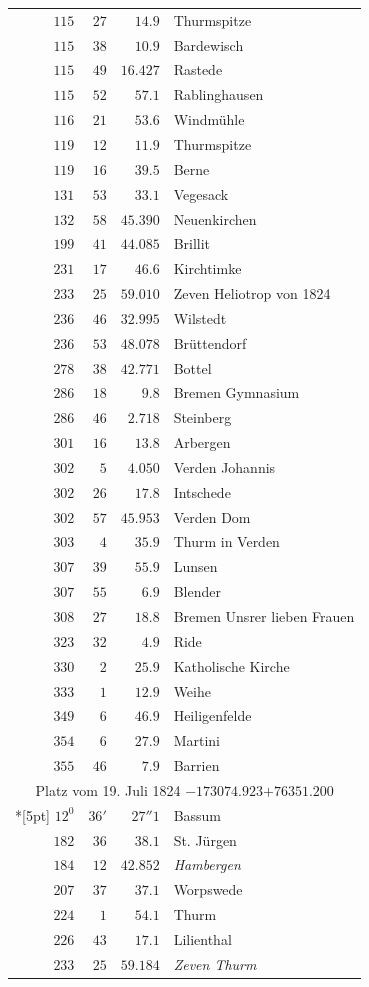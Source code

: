 \begin{longtable}{@{}rrrp{.61\linewidth}@{}}
\(115\)&\(27\)&\(14.9\)&\raggedright Thurmspitze\tabularnewline
\(115\)&\(38\)&\(10.9\)&\raggedright Bardewisch\tabularnewline
\(115\)&\(49\)&\(16.427\)&\raggedright Rastede\tabularnewline
\(115\)&\(52\)&\(57.1\)&\raggedright Rablinghausen\tabularnewline
\(116\)&\(21\)&\(53.6\)&\raggedright Windmühle\tabularnewline
\(119\)&\(12\)&\(11.9\)&\raggedright Thurmspitze\tabularnewline
\(119\)&\(16\)&\(39.5\)&\raggedright Berne\tabularnewline
\(131\)&\(53\)&\(33.1\)&\raggedright Vegesack\tabularnewline
\(132\)&\(58\)&\(45.390\)&\raggedright Neuenkirchen\tabularnewline
\(199\)&\(41\)&\(44.085\)&\raggedright Brillit\tabularnewline
\(231\)&\(17\)&\(46.6\)&\raggedright Kirchtimke\tabularnewline
\(233\)&\(25\)&\(59.010\)&\raggedright Zeven Heliotrop von 1824\tabularnewline
\(236\)&\(46\)&\(32.995\)&\raggedright Wilstedt\tabularnewline
\(236\)&\(53\)&\(48.078\)&\raggedright Brüttendorf\tabularnewline
\(278\)&\(38\)&\(42.771\)&\raggedright Bottel\tabularnewline
\(286\)&\(18\)&\(9.8\)&\raggedright Bremen Gymnasium\tabularnewline
\(286\)&\(46\)&\(2.718\)&\raggedright Steinberg\tabularnewline
\(301\)&\(16\)&\(13.8\)&\raggedright Arbergen\tabularnewline
\(302\)&\(5\)&\(4.050\)&\raggedright Verden Johannis\tabularnewline
\(302\)&\(26\)&\(17.8\)&\raggedright Intschede\tabularnewline
\(302\)&\(57\)&\(45.953\)&\raggedright Verden Dom\tabularnewline
\(303\)&\(4\)&\(35.9\)&\raggedright Thurm in Verden\tabularnewline
\(307\)&\(39\)&\(55.9\)&\raggedright Lunsen\tabularnewline
\(307\)&\(55\)&\(6.9\)&\raggedright Blender\tabularnewline
\(308\)&\(27\)&\(18.8\)&\raggedright Bremen Unsrer lieben Frauen\tabularnewline
\(323\)&\(32\)&\(4.9\)&\raggedright Ride\tabularnewline
\(330\)&\(2\)&\(25.9\)&\raggedright Katholische Kirche\tabularnewline
\(333\)&\(1\)&\(12.9\)&\raggedright Weihe\tabularnewline
\(349\)&\(6\)&\(46.9\)&\raggedright Heiligenfelde\tabularnewline
\(354\)&\(6\)&\(27.9\)&\raggedright Martini\tabularnewline
\(355\)&\(46\)&\(7.9\)&\raggedright Barrien\tabularnewline
\multicolumn{4}{c}{Platz vom 19. Juli 1824 \(-173074.923\)\qquad\(+76351.200\)}\\*[5pt]
\(12^{0}\)&\(36'\)&\(27''1\)&\raggedright Bassum\tabularnewline
\(182\)&\(36\)&\(38.1\)&\raggedright St. Jürgen\tabularnewline
\(184\)&\(12\)&\(42.852\)&\raggedright \textit{Hambergen}\tabularnewline
\(207\)&\(37\)&\(37.1\)&\raggedright Worpswede\tabularnewline
\(224\)&\(1\)&\(54.1\)&\raggedright Thurm\tabularnewline
\(226\)&\(43\)&\(17.1\)&\raggedright Lilienthal\tabularnewline
\(233\)&\(25\)&\(59.184\)&\raggedright \textit{Zeven Thurm}\tabularnewline
\end{longtable}
\endgroup
